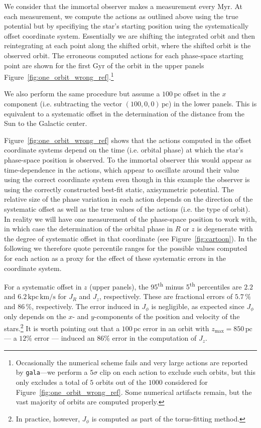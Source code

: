 \documentclass[twocolumn]{aastex62}
\newcommand{\pc}{\text{pc}}
\newcommand{\Myr}{\text{Myr}}
\newcommand{\Gyr}{\text{Gyr}}
\newcommand{\kms}{\text{km}/\text{s}}
\newcommand{\actunit}{\text{kpc}\,\kms}
\begin{document}
We consider that the immortal observer makes a measurement every $\Myr$. At
each measurement, we compute the actions as outlined above using the true
potential but by specifiying the star's starting position using the
systematically offset coordinate system. Essentially we are shifting the
integrated orbit and then reintegrating at each point along the shifted orbit,
where the shifted orbit is the observed orbit. The erroneous computed actions
for each phase-space starting point are shown for the first $\Gyr$ of the
orbit in the upper panels
Figure~\ref{fig:one_orbit_wrong_ref}.\footnote{Occasionally the numerical
scheme fails and very large actions are reported by \texttt{gala}---we perform
a $5\sigma$ clip on each action to exclude such orbits, but this only excludes
a total of $5$ orbits out of the $1000$ considered for
Figure~\ref{fig:one_orbit_wrong_ref}. Some numerical artifacts remain, but the
vast majority of orbits are computed properly.}
    
We also perform the same procedure but assume a $100\,\pc$ offset in the $x$
component (i.e. subtracting the vector $(100, 0, 0)\,\pc$) in the lower
panels. This is equivalent to a systematic offset in the determination of the
distance from the Sun to the Galactic center.

Figure~\ref{fig:one_orbit_wrong_ref} shows that the actions computed in the
offset coordinate systems depend on the time (i.e. orbital phase) at which the
star's phase-space position is observed. To the immortal observer this would
appear as time-dependence in the actions, which appear to oscillate around
their value using the correct coordinate system even though in this example
the observer is using the correctly constructed best-fit static, axisymmetric
potential. The relative size of the phase variation in each action depends on
the direction of the systematic offset as well as the true values of the
actions (i.e. the type of orbit). In reality we will have one measurement of
the phase-space position to work with, in which case the determination of the
orbital phase in $R$ or $z$ is degenerate with the degree of systematic offset
in that coordinate (see Figure~\ref{fig:cartoon}).  In the following we
therefore quote percentile ranges for the possible values computed for each
action as a proxy for the effect of these systematic errors in the coordinate
system.

For a systematic offset in $z$ (upper panels), the 95\textsuperscript{th}
minus 5\textsuperscript{th} percentiles are $2.2$ and $6.2\,\actunit$ for
$J_R$ and $J_z$, respectively. These are fractional errors of $5.7\,\%$ and
$86\,\%$, respectively. The error induced in $J_{\phi}$ is negligible, as
expected since $J_{\phi}$ only depends on the $x$- and $y$-components of the
position and velocity of the stars.\footnote{In practice, however, $J_{\phi}$
is computed as part of the torus-fitting method.} It is worth pointing out
that a $100\,\pc$ error in an orbit with $z_{\text{max}}=850\,\pc$ --- a
$12\%$ error --- induced an $86\%$ error in the computation of $J_z$.
\end{document}

